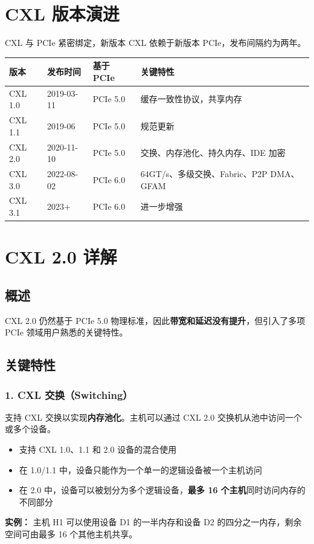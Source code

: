 \documentclass[12pt,a4paper]{article}
\begin{document}
\section{CXL 版本演进}

CXL 与 PCIe 紧密绑定，新版本 CXL 依赖于新版本 PCIe，发布间隔约为两年。

\begin{tcolorbox}[title=CXL 版本时间线]
\begin{tabular}{@{}llll@{}}
\toprule
\textbf{版本} & \textbf{发布时间} & \textbf{基于 PCIe} & \textbf{关键特性} \\
\midrule
CXL 1.0 & 2019-03-11 & PCIe 5.0 & 缓存一致性协议，共享内存 \\
CXL 1.1 & 2019-06 & PCIe 5.0 & 规范更新 \\
CXL 2.0 & 2020-11-10 & PCIe 5.0 & 交换、内存池化、持久内存、IDE 加密 \\
CXL 3.0 & 2022-08-02 & PCIe 6.0 & 64GT/s、多级交换、Fabric、P2P DMA、GFAM \\
CXL 3.1 & 2023+ & PCIe 6.0 & 进一步增强 \\
\bottomrule
\end{tabular}
\end{tcolorbox}

\section{CXL 2.0 详解}

\subsection{概述}

CXL 2.0 仍然基于 PCIe 5.0 物理标准，因此\textbf{带宽和延迟没有提升}，但引入了多项 PCIe 领域用户熟悉的关键特性。

\subsection{关键特性}

\subsubsection{1. CXL 交换（Switching）}

\begin{keypoint}[CXL 2.0 交换]
支持 CXL 交换以实现\textbf{内存池化}。主机可以通过 CXL 2.0 交换机从池中访问一个或多个设备。

\begin{itemize}
    \item 支持 CXL 1.0、1.1 和 2.0 设备的混合使用
    \item 在 1.0/1.1 中，设备只能作为一个单一的逻辑设备被一个主机访问
    \item 在 2.0 中，设备可以被划分为多个逻辑设备，\textbf{最多 16 个主机}同时访问内存的不同部分
\end{itemize}

\textbf{实例：} 主机 H1 可以使用设备 D1 的一半内存和设备 D2 的四分之一内存，剩余空间可由最多 16 个其他主机共享。
\end{keypoint}
\end{document}
